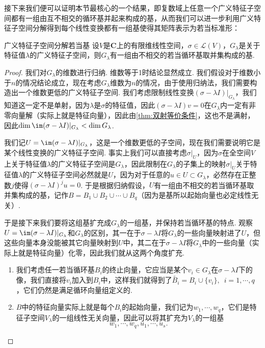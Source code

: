接下来我们便可以证明本节最核心的一个结果，即复数域上任意一个广义特征子空间都有一组由互不相交的循环基并起来构成的基，从而我们可以进一步利用广义特征子空间分解得到每个线性变换都有一组基使得其矩阵表示为若当标准形：
\begin{theorem}{}{广义特征子空间分解若当基}
    设$V$是$\mathbf{C}$上的有限维线性空间，$\sigma\in\mathcal{L}(V)$，$G_\lambda$是关于特征值$\lambda$的广义特征子空间，则$G_\lambda$有一组由不相交的若当循环基取并集构成的基.
\end{theorem}
\begin{proof}
    我们对$G_\lambda$的维数进行归纳. 维数等于1时结论显然成立. 我们假设对于维数小于$n$的情况结论成立，现在考虑$G_\lambda$维数为$n$的情况，由于使用归纳法，我们需要构造出一个维数更低的广义特征子空间. 我们考虑限制线性变换$(\sigma-\lambda I)\vert_{G_\lambda}$，我们知道这一定不是单射，因为$\lambda$是$\sigma$的特征值，因此$(\sigma-\lambda I)v=0$在$G_\lambda$内一定有非零向量解（实际上就是特征向量），因此由\autoref{thm:双射等价条件}，这也不是满射，因此$\dim\im(\sigma-\lambda I)\vert_{G_\lambda}<\dim G_\lambda$.

    我们记$U=\im(\sigma-\lambda I)\vert_{G_\lambda}$，这是一个维数更低的子空间，现在我们需要说明它是某个线性变换的广义特征子空间. 事实上我们可以直接考虑$\sigma\vert_U$，因为$\sigma$在全空间$V$上关于特征值$\lambda$的广义特征子空间是$G_\lambda$，因此限制在$G_\lambda$的子集上的映射$\sigma\vert_U$关于特征值$\lambda$的广义特征子空间必然就是$U$，因为对于任意的$u\in U\subset G_\lambda$，必然存在正整数$j$使得$(\sigma-\lambda I)^ju=0$. 于是根据归纳假设，$U$有一组由不相交的若当循环基取并集构成的基，记作$B=B_1\cup B_2\cup\cdots\cup B_q$（因为是基所以起始向量也必定线性无关）.

    于是接下来我们要将这组基扩充成$G_\lambda$的一组基，并保持若当循环基的特点. 观察$U=\im(\sigma-\lambda I)\vert_{G_\lambda}$和$G_\lambda$的区别，其一在于$\sigma-\lambda I$将$G_\lambda$的一些向量映射进了$U$，但这些向量本身没能被其它向量映射到$U$中，其二在于$\sigma-\lambda I$将$G_\lambda$中的一些向量（实际上就是特征向量）化零，因此我们就从这两个角度扩充.
    \begin{enumerate}
        \item 我们考虑任一若当循环基$B_i$的终止向量，它应当是某个$v_i\in G_\lambda$在$\sigma-\lambda I$下的像，我们直接将$v_i$加入到$B_i$中，这样我们就得到了$\tilde{B_i}=B_i\cup\{v_i\},\enspace i=1,\cdots,q$，它们仍然是满足循环向量组定义的.
        \item $B$中的特征向量实际上就是每个$B_i$的起始向量，我们记为$w_1,\cdots,w_q$，它们是特征子空间$V_\lambda$的一组线性无关向量，因此可以将其扩充为$V_\lambda$的一组基
              \[w_1,\cdots,w_q,u_1,\cdots,u_s.\]
    \end{enumerate}


\end{proof}
